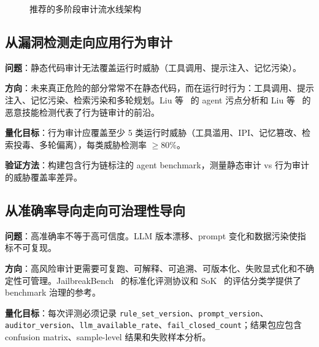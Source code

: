 \documentclass[11pt,a4paper,onecolumn]{article}
\newcommand{\risk}[1]{\texttt{#1}}
\begin{document}
\begin{figure}[htbp]
\caption{推荐的多阶段审计流水线架构}
\label{fig:pipeline}
\end{figure}

\subsection{从漏洞检测走向应用行为审计}
\textbf{问题}：静态代码审计无法覆盖运行时威胁（工具调用、提示注入、记忆污染）。

\textbf{方向}：未来真正危险的部分常常不在静态代码，而在运行时行为：工具调用、提示注入、记忆污染、检索污染和多轮规划。Liu 等~\cite{liu2025taintstyle} 的 agent 污点分析和 Liu 等~\cite{liu2026malskills} 的恶意技能检测代表了行为链审计的前沿。

\textbf{量化目标}：行为审计应覆盖至少 5 类运行时威胁（工具滥用、IPI、记忆篡改、检索投毒、多轮偏离），每类威胁检测率 $\geq 80\%$。

\textbf{验证方法}：构建包含行为链标注的 agent benchmark，测量静态审计 vs 行为审计的威胁覆盖率差异。

\subsection{从准确率导向走向可治理性导向}
\textbf{问题}：高准确率不等于高可信度。LLM 版本漂移、prompt 变化和数据污染使指标不可复现。

\textbf{方向}：高风险审计更需要可复跑、可解释、可追溯、可版本化、失败显式化和不确定性可管理。JailbreakBench~\cite{chao2024jailbreakbench} 的标准化评测协议和 SoK~\cite{sok2025avr} 的评估分类学提供了 benchmark 治理的参考。

\textbf{量化目标}：每次评测必须记录 \risk{rule\_set\_version}、\risk{prompt\_version}、\risk{auditor\_version}、\risk{llm\_available\_rate}、\risk{fail\_closed\_count}；结果包应包含 confusion matrix、sample-level 结果和失败样本分析。
\end{document}
